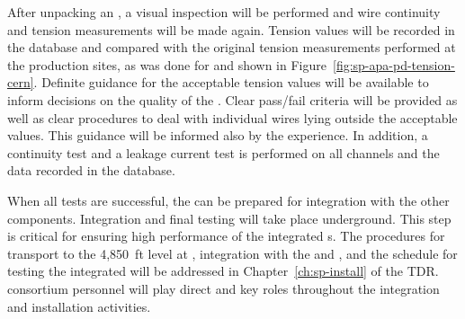 After unpacking an , a visual inspection will be performed and wire continuity and tension measurements will be made again. 
Tension values will be recorded in the database and compared with the original tension measurements performed at the production sites, as was done for  and shown in Figure~\ref{fig:sp-apa-pd-tension-cern}. Definite guidance for the acceptable tension values will be available to inform decisions on the quality of the . Clear pass/fail criteria %
will be provided as well as clear procedures to deal with individual wires lying outside the acceptable values. %
This guidance will be informed also by the  experience. %
In addition, a continuity test and a leakage current test is performed on all channels and the data recorded in the database. 


When all tests are successful, %
the  can be prepared 
for integration with the other components.  Integration and final testing will take place underground. %
This step is critical for ensuring high performance of the integrated s. The procedures for  transport to the 4,850~ft level at , integration with the  and , and the schedule for testing the integrated  will be addressed in %
Chapter~\ref{ch:sp-install} of the  TDR.  consortium personnel will play direct and key roles throughout the integration and installation activities.  


